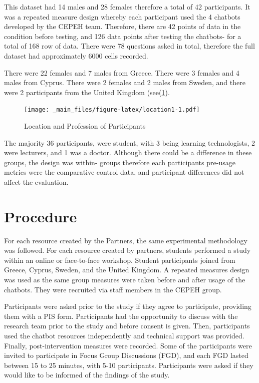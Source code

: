 \documentclass[a4paper, nobind]{templates/ociamthesis}
\begin{document}
This dataset had 14 males and 28 females therefore a total of 42 participants.
It was a repeated measure design whereby each participant used the 4 chatbots developed by the CEPEH team.
Therefore, there are 42 points of data in the condition before testing, and 126 data points after testing the chatbots- for a total of 168 row of data. There were 78 questions asked in total, therefore the full dataset had approximately 6000 cells recorded.

There were 22 females and 7 males from Greece.
There were 3 females and 4 males from Cyprus.
There were 2 females and 2 males from Sweden,
and there were 2 participants from the United Kingdom (see(\ref{fig:location1}).

\begin{figure}
\centering
\texttt{[image: \_main\_files/figure-latex/location1-1.pdf]}
\caption{\label{fig:location1}Location and Profession of Participants}
\end{figure}

The majority 36 participants, were student, with 3 being learning technologists, 2 were lecturers, and 1 was a doctor.
Although there could be a difference in these groups, the design was within- groups therefore each participants pre-usage metrics were the comparative control data, and participant differences did not affect the evaluation.

\hypertarget{procedure}{%
\section{Procedure}\label{procedure}}

For each resource created by the Partners, the same experimental methodology was followed. For each resource created by partners, students performed a study within an online or face-to-face workshop. Student participants joined from Greece, Cyprus, Sweden, and the United Kingdom. A repeated measures design was used as the same group measures were taken before and after usage of the chatbots. They were recruited via staﬀ members in the CEPEH group.

Participants were asked prior to the study if they agree to participate, providing them with a PIS form. Participants had the opportunity to discuss with the research team prior to the study and before consent is given. Then, participants used the chatbot resources independently and technical support was provided. Finally, post-intervention measures were recorded. Some of the participants were invited to participate in Focus Group Discussions (FGD), and each FGD lasted between 15 to 25 minutes, with 5-10 participants. Participants were asked if they would like to be informed of the ﬁndings of the study.
\end{document}
